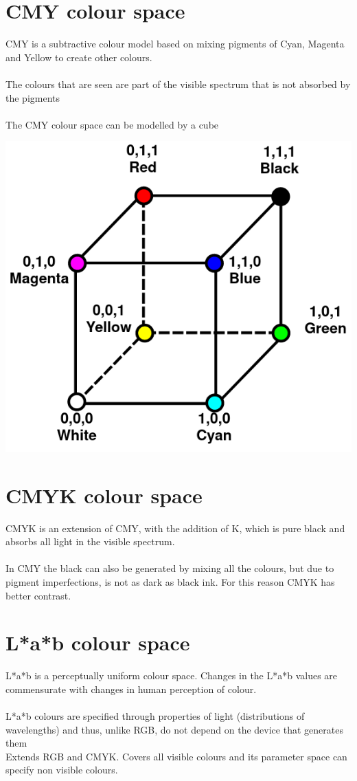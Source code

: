 \documentclass{article}[18pt]
\begin{document}
\section{CMY colour space}
CMY is a subtractive colour model based on mixing pigments of Cyan, Magenta and Yellow to create other colours.\\
\\
The colours that are seen are part of the visible spectrum that is not absorbed by the pigments\\
\\
The CMY colour space can be modelled by a cube
\begin{center}
	\includegraphics[scale=0.7]{CMY}
\end{center}
\section{CMYK colour space}
CMYK is an extension of CMY, with the addition of K, which is pure black and absorbs all light in the visible spectrum.\\
\\
In CMY the black can also be generated by mixing all the colours, but due to pigment imperfections, is not as dark as black ink. For this reason CMYK has better contrast.
\section{L*a*b colour space}
L*a*b is a perceptually uniform colour space. Changes in the L*a*b values are commensurate with changes in human perception of colour.\\
\\
L*a*b colours are specified through properties of light (distributions of wavelengths) and thus, unlike RGB, do not depend on the device that generates them\\
Extends RGB and CMYK. Covers all visible colours and its parameter space can specify non visible colours.
\end{document}
